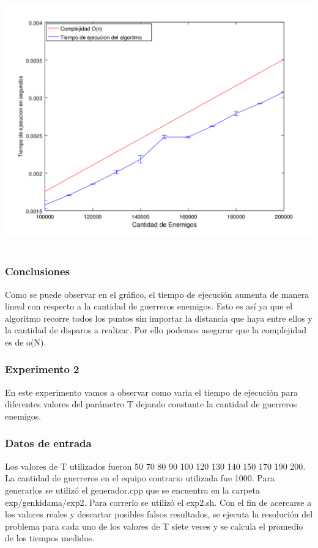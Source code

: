       	\includegraphics[height=11cm]{graficos/genkidama-exp1.png}


    	\subsubsection*{Conclusiones}
			Como se puede observar en el gráfico, el tiempo de ejecución aumenta de manera lineal con respecto a la cantidad de guerreros enemigos. Esto es así ya que el algoritmo recorre todos los puntos sin importar la distancia que haya entre ellos y la cantidad de disparos a realizar. Por ello podemos asegurar que la complejidad es de o(N).
			\\


		\subsubsection*{Experimento 2}
			En este experimento vamos a observar como varia el tiempo de ejecución para diferentes valores del parámetro T dejando constante la cantidad de guerreros enemigos.

		\subsubsection*{Datos de entrada}

		Los valores de T utilizados fueron 50 70 80 90 100 120 130 140 150 170 190 200.
		La cantidad de guerreros en el equipo contrario utilizada fue 1000.
		Para generarlos se utilizó el generador.cpp que se encuentra en la carpeta exp/genkidama/exp2.
		Para correrlo se utilizó el exp2.sh.
		Con el fin de acercarse a los valores reales y descartar posibles falsos resultados, se ejecuta la resolución del problema para cada uno de los valores de T siete veces y se calcula el promedio de los tiempos medidos.

